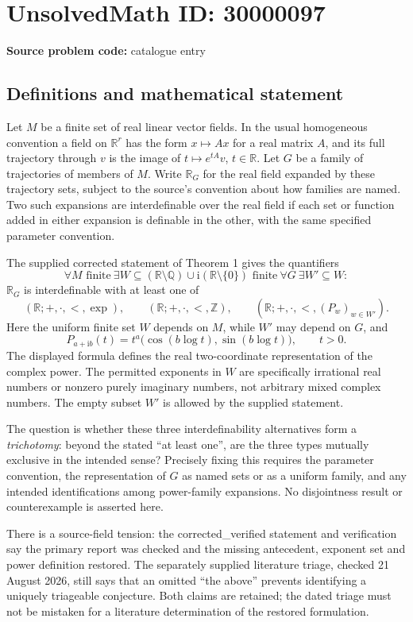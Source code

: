 \documentclass[11pt]{article}
\newcommand{\Z}{\mathbb{Z}}
\newcommand{\Q}{\mathbb{Q}}
\newcommand{\R}{\mathbb{R}}
\begin{document}
\section*{UnsolvedMath ID: 30000097}
\textbf{Source problem code:} catalogue entry
\subsection{Definitions and mathematical statement}
Let $M$ be a finite set of real linear vector fields. In the usual homogeneous convention a field on $\R^r$ has the form $x\mapsto Ax$ for a real matrix $A$, and its full trajectory through $v$ is the image of $t\mapsto e^{tA}v$, $t\in\R$. Let $G$ be a family of trajectories of members of $M$. Write $\R_G$ for the real field expanded by these trajectory sets, subject to the source's convention about how families are named. Two such expansions are interdefinable over the real field if each set or function added in either expansion is definable in the other, with the same specified parameter convention.

The supplied corrected statement of Theorem 1 gives the quantifiers
\[
 \forall M\text{ finite}\ \exists W\subseteq
 (\R\setminus\Q)\cup\mathrm i(\R\setminus\{0\})\text{ finite}\ 
 \forall G\ \exists W'\subseteq W:
\]
$\R_G$ is interdefinable with at least one of
\[
 (\R;+,{\cdot},<,\exp),\qquad
 (\R;+,{\cdot},<,\Z),\qquad
 (\R;+,{\cdot},<,(P_w)_{w\in W'}).
\]
Here the uniform finite set $W$ depends on $M$, while $W'$ may depend on $G$, and
\[
 P_{a+\mathrm i b}(t)=t^a\bigl(\cos(b\log t),\sin(b\log t)\bigr),
 \qquad t>0.
\]
The displayed formula defines the real two-coordinate representation of the complex power. The permitted exponents in $W$ are specifically irrational real numbers or nonzero purely imaginary numbers, not arbitrary mixed complex numbers. The empty subset $W'$ is allowed by the supplied statement.

The question is whether these three interdefinability alternatives form a \emph{trichotomy}: beyond the stated ``at least one'', are the three types mutually exclusive in the intended sense? Precisely fixing this requires the parameter convention, the representation of $G$ as named sets or as a uniform family, and any intended identifications among power-family expansions. No disjointness result or counterexample is asserted here.

There is a source-field tension: the corrected\_verified statement and verification say the primary report was checked and the missing antecedent, exponent set and power definition restored. The separately supplied literature triage, checked 21 August 2026, still says that an omitted ``the above'' prevents identifying a uniquely triageable conjecture. Both claims are retained; the dated triage must not be mistaken for a literature determination of the restored formulation.
\end{document}
